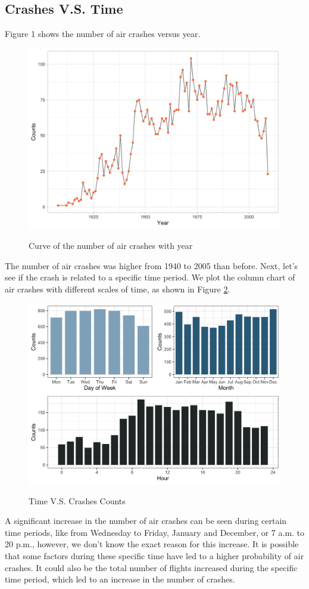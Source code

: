 \documentclass[12pt]{article}
\begin{document}
\subsection{Crashes V.S. Time}
Figure 1 shows the number of air crashes versus year. 
\begin{figure}[ht]
    \centering
    \caption{Curve of the number of air crashes with year}
    \includegraphics[width=.75\textwidth]{time_flow-1.png}
    \label{fig:time_vs_year}
\end{figure}
The number of air crashes was higher from 1940 to 2005 than before. Next, let’s see if the crash is related to a specific time period. We plot the column chart of air crashes with different scales of time, as shown in Figure \ref{fig:time_vs_counts}. 
\begin{figure}[ht]
    \centering
    \caption{Time V.S. Crashes Counts}
    \includegraphics[width=.75\textwidth]{Time_vs_Counts-1.png}
    \label{fig:time_vs_counts}
\end{figure}
A significant increase in the number of air crashes can be seen during certain time periods, like from Wednesday to Friday, January and December, or 7 a.m. to 20 p.m., however, we don’t know the exact reason for this increase. It is possible that some factors during these specific time have led to a higher probability of air crashes. It could also be the total number of flights increased during the specific time period, which led to an increase in the number of crashes. 
\end{document}
